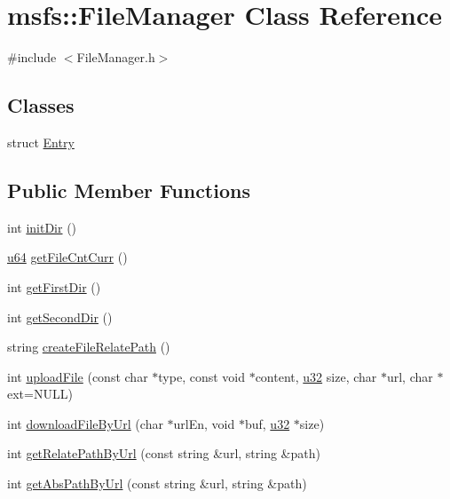 \hypertarget{classmsfs_1_1_file_manager}{}\section{msfs\+:\+:File\+Manager Class Reference}
\label{classmsfs_1_1_file_manager}


{\ttfamily \#include $<$File\+Manager.\+h$>$}

\subsection*{Classes}
\begin{DoxyCompactItemize}
\item 
struct \hyperlink{structmsfs_1_1_file_manager_1_1_entry}{Entry}
\end{DoxyCompactItemize}
\subsection*{Public Member Functions}
\begin{DoxyCompactItemize}
\item 
int \hyperlink{classmsfs_1_1_file_manager_aef5145c0efa010f4e6a72f2a4a376ee7}{init\+Dir} ()
\item 
\hyperlink{_portable_8h_ad758b7a5c3f18ed79d2fcd23d9f16357}{u64} \hyperlink{classmsfs_1_1_file_manager_a612fec74e0a1ded297aeff5a7e1888bb}{get\+File\+Cnt\+Curr} ()
\item 
int \hyperlink{classmsfs_1_1_file_manager_a95fa961158553ba05ba84e7a3da41e48}{get\+First\+Dir} ()
\item 
int \hyperlink{classmsfs_1_1_file_manager_adfd478a84c588d2d08ae9da2d28220f9}{get\+Second\+Dir} ()
\item 
string \hyperlink{classmsfs_1_1_file_manager_aa55b5c0e23dd43990f8321ea78706e6f}{create\+File\+Relate\+Path} ()
\item 
int \hyperlink{classmsfs_1_1_file_manager_a2a0b9d8d0ca59b11c099886f13229940}{upload\+File} (const char $\ast$type, const void $\ast$content, \hyperlink{_portable_8h_a10e94b422ef0c20dcdec20d31a1f5049}{u32} size, char $\ast$url, char $\ast$ext=N\+U\+L\+L)
\item 
int \hyperlink{classmsfs_1_1_file_manager_a9364c93a7c47a3008ebfdb2d99680210}{download\+File\+By\+Url} (char $\ast$url\+En, void $\ast$buf, \hyperlink{_portable_8h_a10e94b422ef0c20dcdec20d31a1f5049}{u32} $\ast$size)
\item 
int \hyperlink{classmsfs_1_1_file_manager_ad367ad7756df006613d1f863a9b8658b}{get\+Relate\+Path\+By\+Url} (const string \&url, string \&path)
\item 
int \hyperlink{classmsfs_1_1_file_manager_a0c7333a3172c84717dd19e8762402dfd}{get\+Abs\+Path\+By\+Url} (const string \&url, string \&path)
\end{DoxyCompactItemize}
